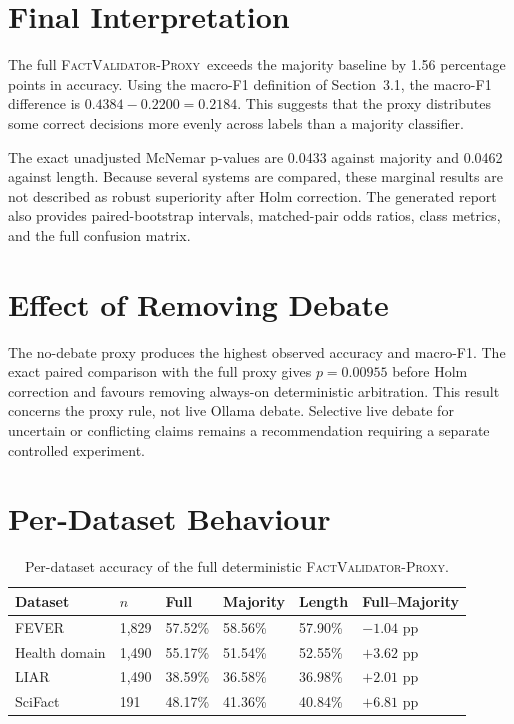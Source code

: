\documentclass[12pt,a4paper,openany]{report}
\newcommand{\proxy}{\textsc{FactValidator-Proxy}}
\begin{document}
\section{Final Interpretation}
The full \proxy\ exceeds the majority baseline by 1.56 percentage points in accuracy. Using the macro-F1 definition of Section~3.1, the macro-F1 difference is $0.4384 - 0.2200 = 0.2184$. This suggests that the proxy distributes some correct decisions more evenly across labels than a majority classifier.

The exact unadjusted McNemar p-values are 0.0433 against majority and 0.0462 against length. Because several systems are compared, these marginal results are not described as robust superiority after Holm correction. The generated report also provides paired-bootstrap intervals, matched-pair odds ratios, class metrics, and the full confusion matrix.

\section{Effect of Removing Debate}
The no-debate proxy produces the highest observed accuracy and macro-F1. The exact paired comparison with the full proxy gives $p=0.00955$ before Holm correction and favours removing always-on deterministic arbitration. This result concerns the proxy rule, not live Ollama debate. Selective live debate for uncertain or conflicting claims remains a recommendation requiring a separate controlled experiment.

\section{Per-Dataset Behaviour}
\begin{table}[H]
\centering
\caption{Per-dataset accuracy of the full deterministic \proxy.}
\label{tab:perdataset}
\small
\begin{tabularx}{\textwidth}{Xp{1.4cm}p{1.6cm}p{1.6cm}p{1.9cm}X}
\toprule
Dataset & $n$ & Full & Majority & Length & Full--Majority \\
\midrule
FEVER & 1{,}829 & 57.52\% & 58.56\% & 57.90\% & $-1.04$ pp \\
Health domain & 1{,}490 & 55.17\% & 51.54\% & 52.55\% & $+3.62$ pp \\
LIAR & 1{,}490 & 38.59\% & 36.58\% & 36.98\% & $+2.01$ pp \\
SciFact & 191 & 48.17\% & 41.36\% & 40.84\% & $+6.81$ pp \\
\bottomrule
\end{tabularx}
\end{table}
\end{document}
